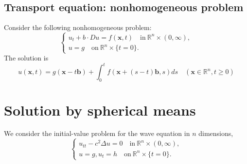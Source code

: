 \documentclass[10pt]{article}
\def\rr{{\mathbb R}}
\def\vc{{\mathbf x}}
\begin{document}
\subsection{Transport equation: nonhomogeneous problem}
Consider the following nonhomogeneous problem:
\begin{equation}
    \begin{cases}
        u_t + b\cdot D u = f(\mathbf{x},t) \quad \text{in} \ \rr^n\times (0,\infty),\\
        u = g \quad \text{on} \ \rr^n \times \{t=0\}.
    \end{cases}
\end{equation}
The solution is
\begin{equation}
    \label{nhte}
    u(\vc,t) = g(\vc-t\mathbf{b}) + \int_0^t f(\vc+(s-t)\mathbf{b},s) ds \quad (\vc \in \rr^n, t\geq 0)
\end{equation}
\section{Solution by spherical means}
We consider the initial-value problem for the wave equation in $n$ dimensions,
\begin{equation}
    \label{wave}
    \begin{cases}
        u_{tt} - c^2\Delta u = 0 \quad \text{in} \ \rr^n\times (0,\infty),\\
        u = g, u_t = h \quad \text{on} \ \rr^n\times \{t=0\}.
    \end{cases}
\end{equation}
\end{document}
